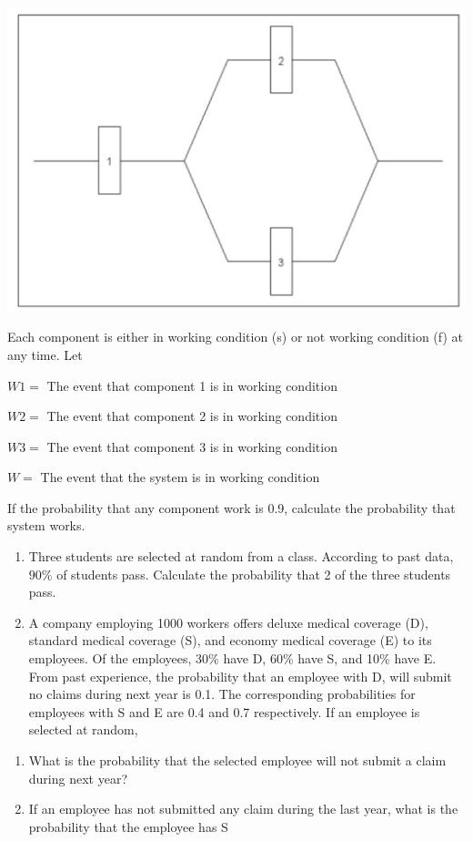 \documentclass[]{book}
\providecommand{\tightlist}{%
  \setlength{\itemsep}{0pt}\setlength{\parskip}{0pt}}
\begin{document}
\begin{center}\includegraphics[width=0.8\linewidth]{figure/Chapter7a} \end{center}

Each component is either in working condition (s) or not working condition (f) at any time.
Let

\(W1 =\) The event that component 1 is in working condition

\(W2 =\) The event that component 2 is in working condition

\(W3 =\) The event that component 3 is in working condition

\(W =\) The event that the system is in working condition

If the probability that any component work is 0.9, calculate the probability that system works.

\begin{enumerate}
\def\labelenumi{\arabic{enumi}.}
\setcounter{enumi}{15}
\item
  Three students are selected at random from a class. According to past data, \(90\%\) of students pass. Calculate the probability that 2 of the three students pass.
\item
  A company employing 1000 workers oﬀers deluxe medical coverage (D), standard medical coverage (S), and economy medical coverage (E) to its employees. Of the employees, 30\% have D, 60\% have S, and 10\% have E. From past experience, the probability that an employee with D, will submit no claims during next year is 0.1. The corresponding probabilities for employees with S and E are 0.4 and 0.7 respectively. If an employee is selected at random,
\end{enumerate}

\begin{enumerate}
\def\labelenumi{(\alph{enumi})}
\tightlist
\item
  What is the probability that the selected employee will not submit a claim during next year?
\item
  If an employee has not submitted any claim during the last year, what is the probability that the employee has S
\end{enumerate}
\end{document}
